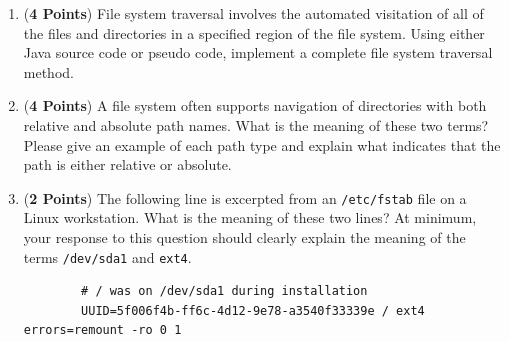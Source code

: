 \documentclass[12pt,epsf,psfig,graphics]{article}
\begin{document}
\begin{enumerate}
\begin{enumerate}
    \item ({\bf 4 Points}) File system traversal involves the automated visitation of all of the files and directories
      in a specified region of the file system. Using either Java source code or pseudo code, implement a complete file
      system traversal method.

    \item ({\bf 4 Points}) A file system often supports navigation of directories with both relative and absolute path
      names.  What is the meaning of these two terms?  Please give an example of each path type and explain what
      indicates that the path is either relative or absolute.

    \item ({\bf 2 Points})  The following line is excerpted from an {\tt /etc/fstab} file on a Linux workstation.  What
      is the meaning of these two lines? At minimum, your response to this question should clearly explain the meaning
      of the terms {\tt /dev/sda1} and {\tt ext4}. \\

      \hspace*{-.75in}
      \vspace*{1in}
      \begin{minipage}{4in}
        \begin{verbatim}
        # / was on /dev/sda1 during installation
        UUID=5f006f4b-ff6c-4d12-9e78-a3540f33339e / ext4 errors=remount -ro 0 1
        \end{verbatim}
      \end{minipage}

  \end{enumerate}

  \newpage


\end{enumerate}
\end{document}
